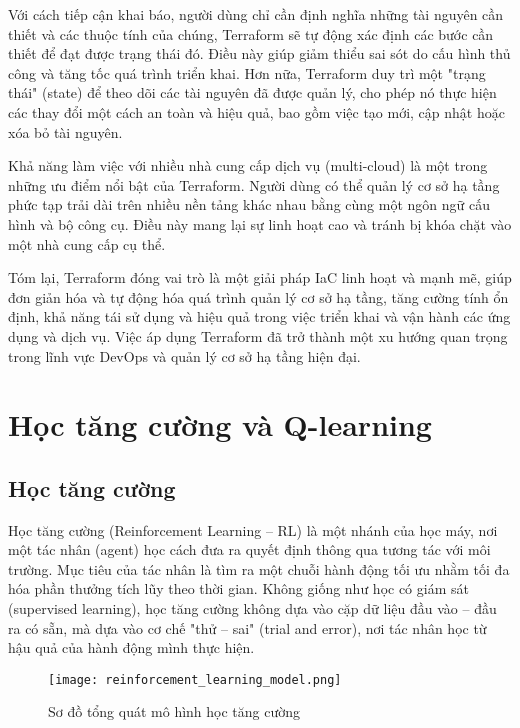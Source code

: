 Với cách tiếp cận khai báo, người dùng chỉ cần định nghĩa những tài nguyên cần thiết và các thuộc tính của chúng, Terraform sẽ tự động xác định các bước cần thiết để đạt được trạng thái đó. Điều này giúp giảm thiểu sai sót do cấu hình thủ công và tăng tốc quá trình triển khai. Hơn nữa, Terraform duy trì một "trạng thái" (state) để theo dõi các tài nguyên đã được quản lý, cho phép nó thực hiện các thay đổi một cách an toàn và hiệu quả, bao gồm việc tạo mới, cập nhật hoặc xóa bỏ tài nguyên.

Khả năng làm việc với nhiều nhà cung cấp dịch vụ (multi-cloud) là một trong những ưu điểm nổi bật của Terraform. Người dùng có thể quản lý cơ sở hạ tầng phức tạp trải dài trên nhiều nền tảng khác nhau bằng cùng một ngôn ngữ cấu hình và bộ công cụ. Điều này mang lại sự linh hoạt cao và tránh bị khóa chặt vào một nhà cung cấp cụ thể.

Tóm lại, Terraform đóng vai trò là một giải pháp IaC linh hoạt và mạnh mẽ, giúp đơn giản hóa và tự động hóa quá trình quản lý cơ sở hạ tầng, tăng cường tính ổn định, khả năng tái sử dụng và hiệu quả trong việc triển khai và vận hành các ứng dụng và dịch vụ. Việc áp dụng Terraform đã trở thành một xu hướng quan trọng trong lĩnh vực DevOps và quản lý cơ sở hạ tầng hiện đại.

\section{Học tăng cường và Q-learning}

\subsection{Học tăng cường}

Học tăng cường (Reinforcement Learning – RL) là một nhánh của học máy, nơi một tác nhân (agent) học cách đưa ra quyết định thông qua tương tác với môi trường. Mục tiêu của tác nhân là tìm ra một chuỗi hành động tối ưu nhằm tối đa hóa phần thưởng tích lũy theo thời gian. Không giống như học có giám sát (supervised learning), học tăng cường không dựa vào cặp dữ liệu đầu vào – đầu ra có sẵn, mà dựa vào cơ chế "thử – sai" (trial and error), nơi tác nhân học từ hậu quả của hành động mình thực hiện.

\begin{figure}
    \texttt{[image: reinforcement\_learning\_model.png]}
    \caption{Sơ đồ tổng quát mô hình học tăng cường}
\end{figure}

